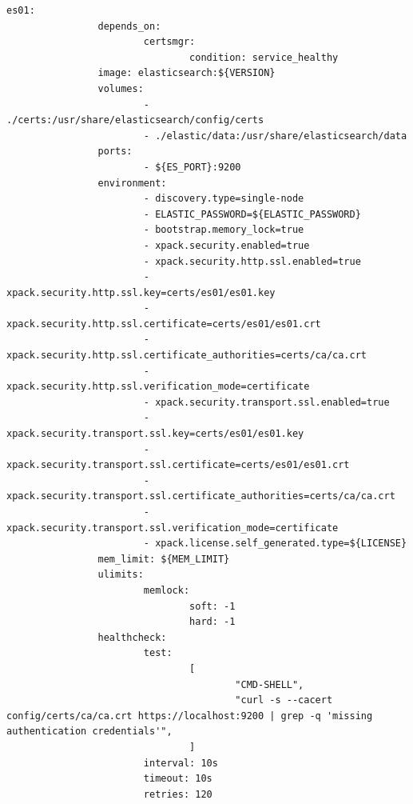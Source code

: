\documentclass[a4paper,12pt]{article}
\begin{document}
\begin{lstlisting}[title=DockerCompose]
        es01:
                depends_on:
                        certsmgr:
                                condition: service_healthy
                image: elasticsearch:${VERSION}
                volumes:
                        - ./certs:/usr/share/elasticsearch/config/certs
                        - ./elastic/data:/usr/share/elasticsearch/data
                ports:
                        - ${ES_PORT}:9200
                environment:
                        - discovery.type=single-node
                        - ELASTIC_PASSWORD=${ELASTIC_PASSWORD}
                        - bootstrap.memory_lock=true
                        - xpack.security.enabled=true
                        - xpack.security.http.ssl.enabled=true
                        - xpack.security.http.ssl.key=certs/es01/es01.key
                        - xpack.security.http.ssl.certificate=certs/es01/es01.crt
                        - xpack.security.http.ssl.certificate_authorities=certs/ca/ca.crt
                        - xpack.security.http.ssl.verification_mode=certificate
                        - xpack.security.transport.ssl.enabled=true
                        - xpack.security.transport.ssl.key=certs/es01/es01.key
                        - xpack.security.transport.ssl.certificate=certs/es01/es01.crt
                        - xpack.security.transport.ssl.certificate_authorities=certs/ca/ca.crt
                        - xpack.security.transport.ssl.verification_mode=certificate
                        - xpack.license.self_generated.type=${LICENSE}
                mem_limit: ${MEM_LIMIT}
                ulimits:
                        memlock:
                                soft: -1
                                hard: -1
                healthcheck:
                        test:
                                [
                                        "CMD-SHELL",
                                        "curl -s --cacert config/certs/ca/ca.crt https://localhost:9200 | grep -q 'missing authentication credentials'",
                                ]
                        interval: 10s
                        timeout: 10s
                        retries: 120


\end{lstlisting}
\end{document}
